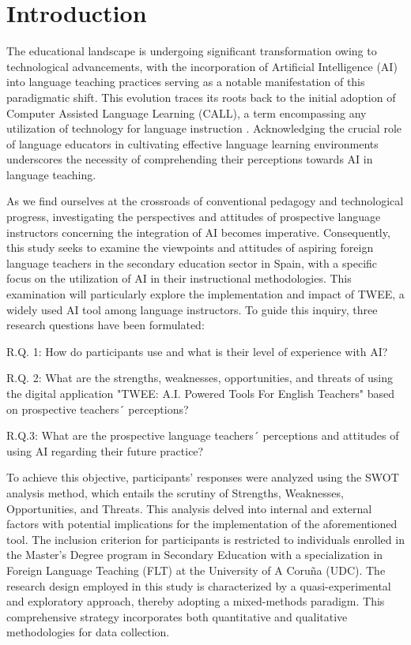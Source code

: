 \section{Introduction}\label{sec-introduction}

The educational landscape is undergoing significant transformation owing
to technological advancements, with the incorporation of Artificial
Intelligence (AI) into language teaching practices serving as a notable
manifestation of this paradigmatic shift. This evolution traces its
roots back to the initial adoption of Computer Assisted Language
Learning (CALL), a term encompassing any utilization of technology for
language instruction \cite[p.~1841]{tafazoli2020}. Acknowledging the
crucial role of language educators in cultivating effective language
learning environments underscores the necessity of comprehending their
perceptions towards AI in language teaching.

As we find ourselves at the crossroads of conventional pedagogy and
technological progress, investigating the perspectives and attitudes of
prospective language instructors concerning the integration of AI
becomes imperative. Consequently, this study seeks to examine the
viewpoints and attitudes of aspiring foreign language teachers in the
secondary education sector in Spain, with a specific focus on the
utilization of AI in their instructional methodologies. This examination
will particularly explore the implementation and impact of TWEE, a
widely used AI tool among language instructors. To guide this inquiry,
three research questions have been formulated:

R.Q. 1: How do participants use and what is their level of experience
with AI?

R.Q. 2: What are the strengths, weaknesses, opportunities, and threats
of using the digital application "TWEE: A.I. Powered Tools For English
Teachers" based on prospective teachers´ perceptions?

R.Q.3: What are the prospective language teachers´ perceptions and
attitudes of using AI regarding their future practice?

To achieve this objective, participants' responses were
analyzed using the SWOT analysis method, which entails the scrutiny of
Strengths, Weaknesses, Opportunities, and Threats. This analysis delved
into internal and external factors with potential implications for the
implementation of the aforementioned tool. The inclusion criterion for
participants is restricted to individuals enrolled in the
Master's Degree program in Secondary Education with a
specialization in Foreign Language Teaching (FLT) at the University of A
Coruña (UDC). The research design employed in this study is
characterized by a quasi-experimental and exploratory approach, thereby
adopting a mixed-methods paradigm. This comprehensive strategy
incorporates both quantitative and qualitative methodologies for data
collection.